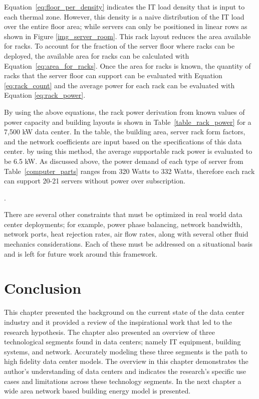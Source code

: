     
    
    
    Equation~\ref{eq:floor_per_density} indicates the  IT load density that is input to each thermal zone. However, this density is a naive distribution of the IT load over the entire floor area; while servers can only be positioned in linear rows as shown in Figure \ref{img_server_room}. This rack layout reduces the area available for racks. To account for the fraction of the server floor where racks can be deployed, the available area for racks can be calculated with Equation~\ref{eq:area_for_racks}. Once the area for racks is known, the quantity of racks that the server floor can support can be evaluated with Equation \ref{eq:rack_count} and the average power for each rack can be evaluated with Equation \ref{eq:rack_power}.
    
    By using the above equations, the rack power derivation from known values of power capacity and building layouts is shown in Table~\ref{table_rack_power} for a 7,500 kW data center. In the table, the building area, server rack form factors, and the network coefficients are input based on the specifications of this data center. by using this method, the average supportable rack power is evaluated to be 6.5 kW. As discussed above, the power demand of each type of server from Table~\ref{computer_parts} ranges from 320 Watts to 332 Watts, therefore each rack can support 20-21 servers without power over subscription.
    
    .
    
    There are several other constraints that must be optimized in real world data center deployments; for example, power phase balancing, network bandwidth, network ports, heat rejection rates, air flow rates, along with several other fluid mechanics considerations. Each of these must be addressed on a situational basis and is left for future work around this framework.
        
    \section{Conclusion}
    This chapter presented the background on the current state of the data center industry and it provided a review of the inspirational work that led to the research hypothesis. The chapter also presented an overview of three technological segments found in data centers; namely IT equipment, building systems, and network. Accurately modeling these three segments is the path to high fidelity data center models. The overview in this chapter demonstrates the author's understanding of data centers and indicates the research's specific use cases and limitations across these technology segments. In the next chapter a wide area network based building energy model is presented.
    
   
    

    
    
